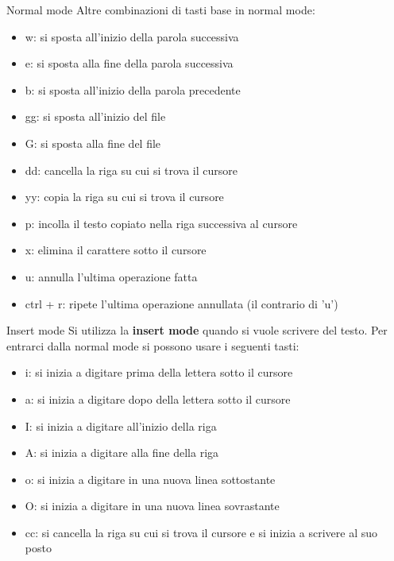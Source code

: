 \documentclass{beamer}
\begin{document}
\begin{frame}{Normal mode}
  Altre combinazioni di tasti base in normal mode:
  \begin{itemize}
    \item w: si sposta all'inizio della parola successiva
    \item e: si sposta alla fine della parola successiva
    \item b: si sposta all'inizio della parola precedente
    \item gg: si sposta all'inizio del file
    \item G: si sposta alla fine del file
    \item dd: cancella la riga su cui si trova il cursore
    \item yy: copia la riga su cui si trova il cursore
    \item p: incolla il testo copiato nella riga successiva al cursore
    \item x: elimina il carattere sotto il cursore
    \item u: annulla l'ultima operazione fatta
    \item ctrl + r: ripete l'ultima operazione annullata (il contrario di 'u')
  \end{itemize}
\end{frame}

\begin{frame}{Insert mode}
  Si utilizza la \textbf{insert mode} quando si vuole scrivere del testo. Per
  entrarci dalla normal mode si possono usare i seguenti tasti:
  \begin{itemize}
    \item i: si inizia a digitare prima della lettera sotto il cursore
    \item a: si inizia a digitare dopo della lettera sotto il cursore
    \item I: si inizia a digitare all'inizio della riga
    \item A: si inizia a digitare alla fine della riga
    \item o: si inizia a digitare in una nuova linea sottostante
    \item O: si inizia a digitare in una nuova linea sovrastante
    \item cc: si cancella la riga su cui si trova il cursore e si inizia a 
      scrivere al suo posto
  \end{itemize}
\end{frame}
\end{document}
